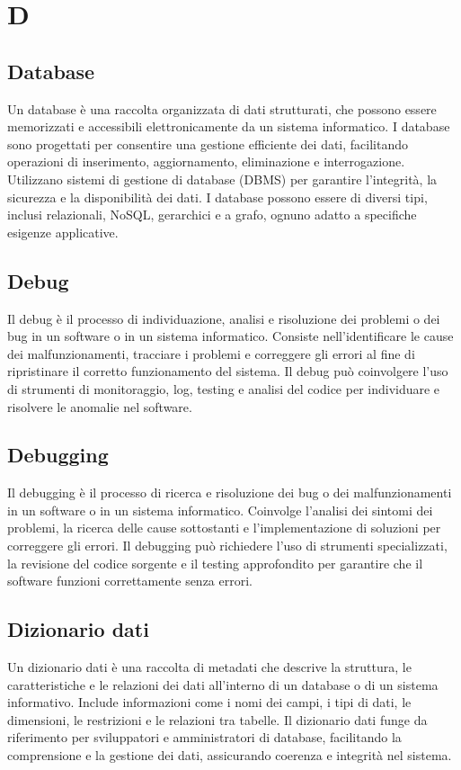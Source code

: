 \section{D}

\vspace{2em}
\subsection*{Database}
Un database è una raccolta organizzata di dati strutturati, che possono essere memorizzati e accessibili elettronicamente da un sistema informatico. I database sono progettati per consentire una gestione efficiente dei dati, facilitando operazioni di inserimento, aggiornamento, eliminazione e interrogazione. Utilizzano sistemi di gestione di database (DBMS) per garantire l'integrità, la sicurezza e la disponibilità dei dati. I database possono essere di diversi tipi, inclusi relazionali, NoSQL, gerarchici e a grafo, ognuno adatto a specifiche esigenze applicative.

\vspace{2em}
\subsection*{Debug}
Il debug è il processo di individuazione, analisi e risoluzione dei problemi o dei bug in un software o in un sistema informatico. Consiste nell'identificare le cause dei malfunzionamenti, tracciare i problemi e correggere gli errori al fine di ripristinare il corretto funzionamento del sistema. Il debug può coinvolgere l'uso di strumenti di monitoraggio, log, testing e analisi del codice per individuare e risolvere le anomalie nel software.

\vspace{2em}
\subsection*{Debugging}
Il debugging è il processo di ricerca e risoluzione dei bug o dei malfunzionamenti in un software o in un sistema informatico. Coinvolge l'analisi dei sintomi dei problemi, la ricerca delle cause sottostanti e l'implementazione di soluzioni per correggere gli errori. Il debugging può richiedere l'uso di strumenti specializzati, la revisione del codice sorgente e il testing approfondito per garantire che il software funzioni correttamente senza errori.

\vspace{2em}
\subsection*{Dizionario dati}
Un dizionario dati è una raccolta di metadati che descrive la struttura, le caratteristiche e le relazioni dei dati all'interno di un database o di un sistema informativo. Include informazioni come i nomi dei campi, i tipi di dati, le dimensioni, le restrizioni e le relazioni tra tabelle. Il dizionario dati funge da riferimento per sviluppatori e amministratori di database, facilitando la comprensione e la gestione dei dati, assicurando coerenza e integrità nel sistema.

